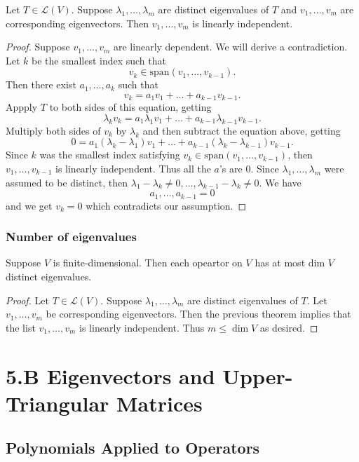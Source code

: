 \documentclass[11pt]{article}
\begin{document}
    Let \(T \in \mathcal{L}(V)\). Suppose \(\lambda_1, \dots, \lambda_m\) are distinct eigenvalues of $T$ and \(v_1, \dots, v_m\) are corresponding eigenvectors. Then \(v_1, \dots, v_m\) is linearly independent. 

    \begin{proof}
        Suppose \(v_1, \dots, v_m\) are linearly dependent. We will derive a contradiction. Let $k$ be the smallest index such that \[v_k \in \text{span}(v_1, \dots, v_{k-1}).\] Then there exist \(a_1, \dots, a_k\) such that \[v_k = a_1 v_1 + \dots + a_{k-1} v_{k-1}.\] Appply $T$ to both sides of this equation, getting \[\lambda_k v_k = a_1 \lambda_1 v_1 + \dots + a_{k-1} \lambda_{k-1} v_{k-1}.\] Multiply both sides of \(v_k\) by \(\lambda_k\) and then subtract the equation above, getting \[0 = a_1 (\lambda_k - \lambda_1) v_1 + \dots + a_{k-1} (\lambda_k - \lambda_{k-1}) v_{k-1}.\] Since $k$ was the smallest index satisfying \(v_k \in \text{span}(v_1, \dots, v_{k-1})\), then \(v_1, \dots, v_{k-1}\) is linearly independent. Thus all the $a$'s are 0. Since \(\lambda_1, \dots, \lambda_m\) were assumed to be distinct, then \(\lambda_1 - \lambda_k \neq 0, \dots, \lambda_{k-1} - \lambda_k \neq 0\). We have \[a_1, \dots, a_{k-1} = 0\] and we get \(v_k = 0\) which contradicts our assumption. 
    \end{proof}

    \subsubsection{Number of eigenvalues}

    Suppose $V$ is finite-dimensional. Then each opeartor on $V$ has at most dim $V$ distinct eigenvalues. 

    \begin{proof}
        Let \(T \in \mathcal{L}(V)\). Suppose \(\lambda_1, \dots, \lambda_m\) are distinct eigenvalues of $T$. Let \(v_1, \dots, v_m\) be corresponding eigenvectors. Then the previous theorem implies that the list \(v_1, \dots, v_m\) is linearly independent. Thus \(m \leq \dim V\) as desired. 
    \end{proof}

    \section{5.B Eigenvectors and Upper-Triangular Matrices}

    \subsection{Polynomials Applied to Operators}
\end{document}
